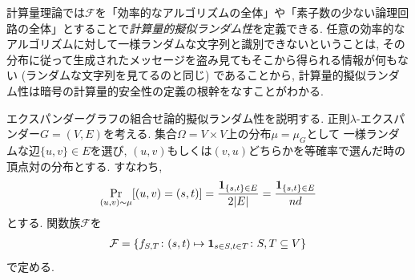 計算量理論では$\mathcal{F}$を「効率的なアルゴリズムの全体」や「素子数の少ない論理回路の全体」とすることで\emph{計算量的擬似ランダム性}を定義できる.
任意の効率的なアルゴリズムに対して一様ランダムな文字列と識別できないということは, その分布に従って生成されたメッセージを盗み見てもそこから得られる情報が何もない (ランダムな文字列を見てるのと同じ) であることから, 計算量的擬似ランダム性は暗号の計算量的安全性の定義の根幹をなすことがわかる.

エクスパンダーグラフの組合せ論的擬似ランダム性を説明する.
正則$\lambda$-エクスパンダー$G=(V,E)$を考える.
集合$\Omega=V\times V$上の分布$\mu = \mu_G$として
一様ランダムな辺$\{u,v\}\in E$を選び, $(u,v)$もしくは$(v,u)$どちらかを等確率で選んだ時の頂点対の分布とする.
すなわち,
\begin{align}
    \Pr_{(u,v)\sim \mu}\sbra*{ (u,v) = (s,t)} = \frac{\indicator{\{s,t\}\in E}}{2\abs{E}} = \frac{\indicator{\{s,t\}\in E}}{nd} \label{eq:expander mu}
\end{align}
とする.
関数族$\mathcal{F}$を
\begin{align}
    \mathcal{F} = \cbra*{ f_{S,T} \colon (s,t) \mapsto \indicator{s\in S,t\in T} \colon S,T\subseteq V}  \label{eq:expander F}
\end{align}
で定める.

